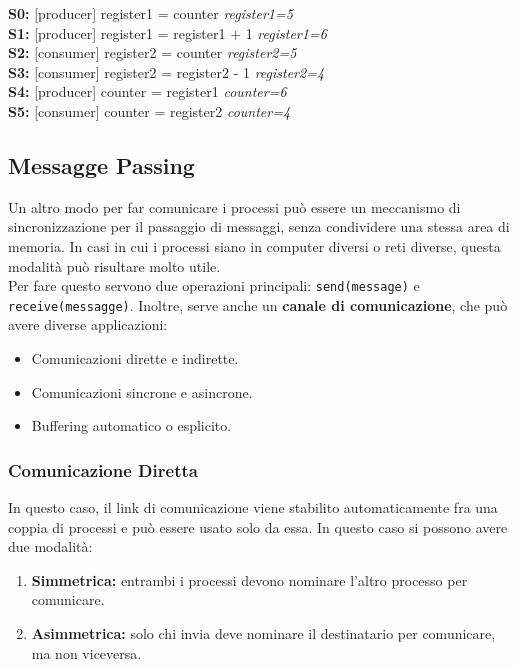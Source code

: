 \begin{ex}
\textbf{S0:} [producer] register1 = counter \space\space\space\space\space\space\space\space\space\space\textit{register1=5} \\
\textbf{S1:} [producer] register1 = register1 + 1 \space\space\space\textit{register1=6} \\
\textbf{S2:} [consumer] register2 = counter \space\space\space\space\space\space\space\space\space\textit{register2=5} \\
\textbf{S3:} [consumer] register2 = register2 - 1 \space\space\space\textit{register2=4} \\
\textbf{S4:} [producer] counter = register1 \space\space\space\space\space\space\space\space\space\space\textit{counter=6} \\
\textbf{S5:} [consumer] counter = register2 \space\space\space\space\space\space\space\space\space\textit{counter=4}
\end{ex}

\subsection{Messagge Passing}
Un altro modo per far comunicare i processi può essere un meccanismo di sincronizzazione per il passaggio di messaggi, senza condividere una stessa area di memoria.
In casi in cui i processi siano in computer diversi o reti diverse, questa modalità può risultare molto utile. \\
Per fare questo servono due operazioni principali: \texttt{send(message)} e \texttt{receive(messagge)}. Inoltre, serve anche un \textbf{canale di comunicazione}, che può avere diverse applicazioni:
\begin{itemize}
  \item Comunicazioni dirette e indirette.
  \item Comunicazioni sincrone e asincrone.
  \item Buffering automatico o esplicito.
\end{itemize}

\subsubsection{Comunicazione Diretta}
In questo caso, il link di comunicazione viene stabilito automaticamente fra una coppia di processi e può essere usato solo da essa.
In questo caso si possono avere due modalità:
\begin{enumerate}
  \item \textbf{Simmetrica:} entrambi i processi devono nominare l'altro processo per comunicare.
  \item \textbf{Asimmetrica:} solo chi invia deve nominare il destinatario per comunicare, ma non viceversa.
\end{enumerate}


